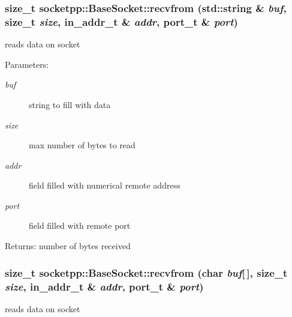 \begin{CompactItemize}
{\subsubsection[{recvfrom}]{\setlength{\rightskip}{0pt plus 5cm}size\_\-t socketpp::BaseSocket::recvfrom (std::string \& {\em buf}, \/  size\_\-t {\em size}, \/  in\_\-addr\_\-t \& {\em addr}, \/  {\bf port\_\-t} \& {\em port})}}
\label{classsocketpp_1_1BaseSocket_d2656c57d84c4ff032cd3d9ad4608bfa}


reads data on socket 

\begin{Desc}
\item[Parameters:]
\begin{description}
\item[{\em buf}]string to fill with data \item[{\em size}]max number of bytes to read \item[{\em addr}]field filled with numerical remote address \item[{\em port}]field filled with remote port \end{description}
\end{Desc}
\begin{Desc}
\item[Returns:]number of bytes received \end{Desc}
\hypertarget{classsocketpp_1_1BaseSocket_11ebe50d7ae76c21ef55d38cb87cc700}{
\subsubsection[{recvfrom}]{\setlength{\rightskip}{0pt plus 5cm}size\_\-t socketpp::BaseSocket::recvfrom (char {\em buf}\mbox{[}$\,$\mbox{]}, \/  size\_\-t {\em size}, \/  in\_\-addr\_\-t \& {\em addr}, \/  {\bf port\_\-t} \& {\em port})}}
\label{classsocketpp_1_1BaseSocket_11ebe50d7ae76c21ef55d38cb87cc700}


reads data on socket 


\end{CompactItemize}
